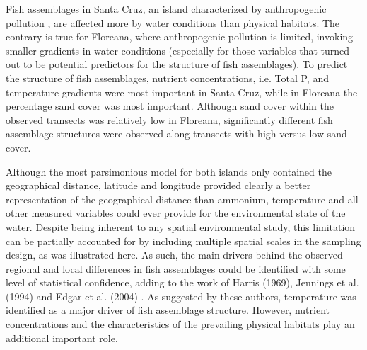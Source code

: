 Fish assemblages in Santa Cruz, an island characterized by anthropogenic pollution \citep{Werdeman2006EffectsBays,Mateus2019AnArchipelago}, are affected more by water conditions than physical habitats. The contrary is true for Floreana, where anthropogenic pollution is limited, invoking smaller gradients in water conditions (especially for those variables that turned out to be potential predictors for the structure of fish assemblages). To predict the structure of fish assemblages, nutrient concentrations, i.e. Total P, and temperature gradients were most important in Santa Cruz, while in Floreana the percentage sand cover was most important. Although sand cover within the observed transects was relatively low in Floreana, significantly different fish assemblage structures were observed along transects with high versus low sand cover.

Although the most parsimonious model for both islands only contained the geographical distance, latitude and longitude provided clearly a better representation of the geographical distance than ammonium, temperature and all other measured variables could ever provide for the environmental state of the water. Despite being inherent to any spatial environmental study, this limitation can be partially accounted for by including multiple spatial scales in the sampling design, as was illustrated here. As such, the main drivers behind the observed regional and local differences in fish assemblages could be identified with some level of statistical confidence, adding to the work of Harris (1969), Jennings et al. (1994) and Edgar et al. (2004) \citep{Harris1969BreedingIslands,Jennings1994TheArchipelago,Edgar2004}. As suggested by these authors, temperature was identified as a major driver of fish assemblage structure. However, nutrient concentrations and the characteristics of the prevailing physical habitats play an additional important role. 